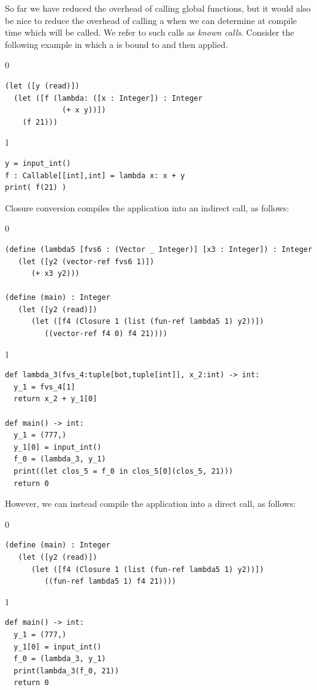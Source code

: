 \documentclass[7x10]{TimesAPriori_MIT}%
\def\racketEd{0}
\def\pythonEd{1}
\def\edition{1}
\newcommand{\pythonColor}[0]{}
\numberwithin{theorem}{chapter}
\numberwithin{definition}{chapter}
\numberwithin{equation}{chapter}
\begin{document}
So far we have reduced the overhead of calling global functions, but
it would also be nice to reduce the overhead of calling a
 when we can determine at compile time which
 will be called. We refer to such calls as \emph{known
  calls}.  Consider the following example in which a  is
bound to  and then applied.
{\if\edition\racketEd
\begin{lstlisting}
(let ([y (read)])
  (let ([f (lambda: ([x : Integer]) : Integer
             (+ x y))])
    (f 21)))
\end{lstlisting}
\fi}
{\if\edition\pythonEd\pythonColor
\begin{lstlisting}
y = input_int()
f : Callable[[int],int] = lambda x: x + y
print( f(21) )
\end{lstlisting}
\fi}
%
\noindent Closure conversion compiles the application
 into an indirect call, as follows:
%
{\if\edition\racketEd
\begin{lstlisting}
(define (lambda5 [fvs6 : (Vector _ Integer)] [x3 : Integer]) : Integer
   (let ([y2 (vector-ref fvs6 1)])
      (+ x3 y2)))

(define (main) : Integer
   (let ([y2 (read)])
      (let ([f4 (Closure 1 (list (fun-ref lambda5 1) y2))])
         ((vector-ref f4 0) f4 21))))
\end{lstlisting}
\fi}
{\if\edition\pythonEd\pythonColor
\begin{lstlisting}
def lambda_3(fvs_4:tuple[bot,tuple[int]], x_2:int) -> int:
  y_1 = fvs_4[1]
  return x_2 + y_1[0]

def main() -> int:
  y_1 = (777,)
  y_1[0] = input_int()
  f_0 = (lambda_3, y_1)
  print((let clos_5 = f_0 in clos_5[0](clos_5, 21)))
  return 0
\end{lstlisting}
\fi}
%
\noindent However, we can instead compile the application
 into a direct call, as follows:
%
{\if\edition\racketEd
\begin{lstlisting}
(define (main) : Integer
   (let ([y2 (read)])
      (let ([f4 (Closure 1 (list (fun-ref lambda5 1) y2))])
         ((fun-ref lambda5 1) f4 21))))
\end{lstlisting}
\fi}
{\if\edition\pythonEd\pythonColor
\begin{lstlisting}
def main() -> int:
  y_1 = (777,)
  y_1[0] = input_int()
  f_0 = (lambda_3, y_1)
  print(lambda_3(f_0, 21))
  return 0
\end{lstlisting}
\fi}
\end{document}
